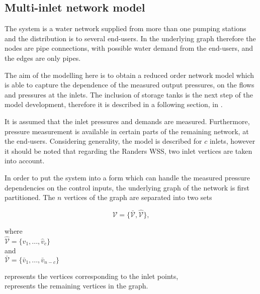\subsection{Multi-inlet network model}
\label{multi_inlet_reduced_network_description}

The system is a water network supplied from more than one pumping stations and the distribution is to several end-users. In the underlying graph therefore the nodes are pipe connections, with possible water demand from the end-users, and the edges are only pipes. 

The aim of the modelling here is to obtain a reduced order network model which is able to capture the dependence of the measured output pressures, on the flows and pressures at the inlets. The inclusion of storage tanks is the next step of the model development, therefore it is described in a following section, in . 

It is assumed that the inlet pressures and demands are measured. Furthermore, pressure measurement is available in certain parts of the remaining network, at the end-users. Considering generality, the model is described for $c$ inlets, however it should be noted that regarding the Randers WSS, two inlet vertices are taken into account. 

In order to put the system into a form which can handle the measured pressure dependencies on the control inputs, the underlying graph of the network is first partitioned. The $n$ vertices of the graph are separated into two sets

\begin{equation}
  \label{vertices1}
  \mathcal{V} = \{\bar{\mathcal{V}}, \hat{\mathcal{V}} \}, 
\end{equation}

\begin{minipage}[t]{0.3\textwidth}
where\\
\hspace*{8mm} $\hat{\mathcal{V}} = \{\hat{v}_1, ..., \hat{v}_c\}$\\
\newline
and \\
\hspace*{8mm} $\bar{\mathcal{V}} = \{\bar{v}_1, ..., \bar{v}_{n-c}\}$ 
\end{minipage}
\begin{minipage}[t]{0.55\textwidth}
\vspace*{2mm}
 represents the vertices corresponding to the inlet points,\\
 \newline
 represents the remaining vertices in the graph.
\end{minipage}

